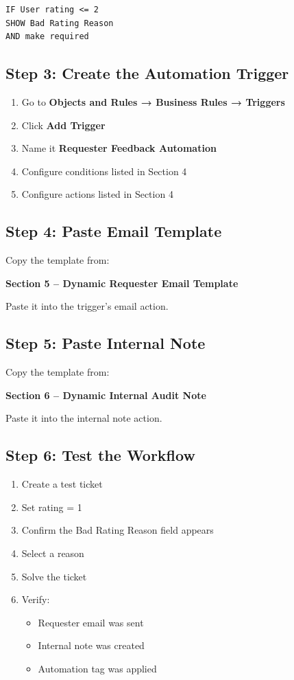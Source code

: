 \documentclass[11pt]{article}
\begin{document}
\begin{lstlisting}
IF User rating <= 2
SHOW Bad Rating Reason
AND make required
\end{lstlisting}

\subsection{Step 3: Create the Automation Trigger}

\begin{enumerate}
\item Go to \textbf{Objects and Rules → Business Rules → Triggers}
\item Click \textbf{Add Trigger}
\item Name it \textbf{Requester Feedback Automation}
\item Configure conditions listed in Section 4
\item Configure actions listed in Section 4
\end{enumerate}

\subsection{Step 4: Paste Email Template}

Copy the template from:

\textbf{Section 5 – Dynamic Requester Email Template}

Paste it into the trigger's email action.

\subsection{Step 5: Paste Internal Note}

Copy the template from:

\textbf{Section 6 – Dynamic Internal Audit Note}

Paste it into the internal note action.

\subsection{Step 6: Test the Workflow}

\begin{enumerate}
\item Create a test ticket
\item Set rating = 1
\item Confirm the Bad Rating Reason field appears
\item Select a reason
\item Solve the ticket
\item Verify:
\begin{itemize}
\item Requester email was sent
\item Internal note was created
\item Automation tag was applied
\end{itemize}
\end{enumerate}
\end{document}
